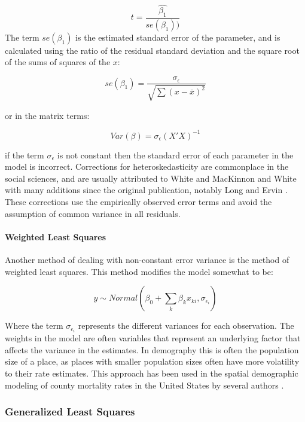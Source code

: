 \documentclass[
]{article}
\begin{document}
\[t = \frac{\hat{\beta_1}}{se(\beta_1))}\]
The term \(se(\beta_1)\) is the estimated standard error of the parameter, and is calculated using the ratio of the residual standard deviation and the square root of the sums of squares of the \(x\):

\[se(\beta_1) = \frac{\sigma_{\epsilon}}{\sqrt{\sum(x - \bar{x})^2}}\]

or in the matrix terms:

\[Var(\beta) = \sigma_{\epsilon}(X'X)^{-1}\]

if the term \(\sigma_{\epsilon}\) is not constant then the standard error of each parameter in the model is incorrect. Corrections for heteroskedasticity are commonplace in the social sciences, and are usually attributed to White \citeyearpar{white_1980} and MacKinnon and White \citeyearpar{mackinnon_white_1985} with many additions since the original publication, notably Long and Ervin \citeyearpar{long_using_2000}. These corrections use the empirically observed error terms and avoid the assumption of common variance in all residuals.

\hypertarget{weighted-least-squares}{%
\paragraph{Weighted Least Squares}\label{weighted-least-squares}}

Another method of dealing with non-constant error variance is the method of weighted least squares. This method modifies the model somewhat to be:

\[y \sim Normal(\beta_0 +\sum_k \beta_k x_{ki}, \sigma_{\epsilon_i} )\]

Where the term \(\sigma_{\epsilon_i}\) represents the different variances for each observation. The weights in the model are often variables that represent an underlying factor that affects the variance in the estimates. In demography this is often the population size of a place, as places with smaller population sizes often have more volatility to their rate estimates. This approach has been used in the spatial demographic modeling of county mortality rates in the United States by several authors \citep{mclaughlin_differential_2007, sparks_application_2010}.

\hypertarget{generalized-least-squares}{%
\subsubsection{Generalized Least Squares}\label{generalized-least-squares}}
\end{document}
